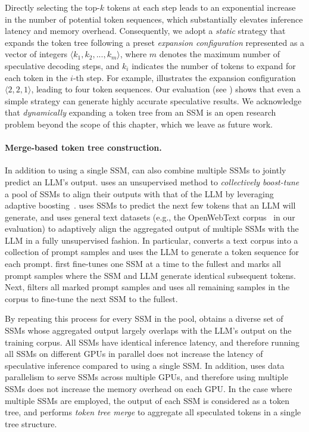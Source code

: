 Directly selecting the top-$k$ tokens at each step leads to an exponential increase in the number of potential token sequences, which substantially elevates inference latency and memory overhead. Consequently, we adopt a {\em static} strategy that expands the token tree following a preset {\em expansion configuration} represented as a vector of integers $\langle k_1, k_2, ..., k_m\rangle$, where $m$ denotes the maximum number of speculative decoding steps, and $k_i$ indicates the number of tokens to expand for each token in the $i$-th step.
For example,  illustrates the expansion configuration $\langle 2, 2, 1 \rangle$, leading to four token sequences.
Our evaluation (see ) shows that even a simple strategy can generate highly accurate speculative results.
We acknowledge that {\em dynamically} expanding a token tree from an SSM is an open research problem beyond the scope of this chapter, which we leave as future work.

\paragraph{Merge-based token tree construction.}
In addition to using a single SSM, \SpecInfer can also combine multiple SSMs to jointly predict an LLM's output. \SpecInfer uses an unsupervised method to {\em collectively boost-tune} a pool of SSMs to align their outputs with that of the LLM by leveraging adaptive boosting~\cite{freund1999short}.
\SpecInfer uses SSMs to predict the next few tokens that an LLM will generate, and uses general text datasets (e.g., the OpenWebText corpus~\cite{Gokaslan2019OpenWeb} in our evaluation) to adaptively align the aggregated output of multiple SSMs with the LLM in a fully unsupervised fashion.
In particular, \SpecInfer converts a text corpus into a collection of prompt samples and uses the LLM to generate a token sequence for each prompt.
\SpecInfer first fine-tunes one SSM at a time to the fullest and marks all prompt samples where the SSM and LLM generate identical subsequent tokens.
Next, \SpecInfer filters all marked prompt samples and uses all remaining samples in the corpus to fine-tune the next SSM to the fullest.

By repeating this process for every SSM in the pool, \SpecInfer obtains a diverse set of SSMs whose aggregated output largely overlaps with the LLM's output on the training corpus.
All SSMs have identical inference latency, and therefore running all SSMs on different GPUs in parallel does not increase the latency of speculative inference compared to using a single SSM.
In addition, \SpecInfer uses data parallelism to serve SSMs across multiple GPUs, and therefore using multiple SSMs does not increase the memory overhead on each GPU.
In the case where multiple SSMs are employed, the output of each SSM is considered as a token tree, and \SpecInfer performs {\em token tree merge} to aggregate all speculated tokens in a single tree structure.

